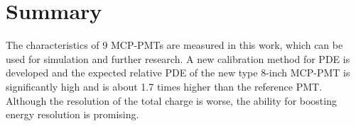 \section{Summary}
\label{Summary}
The characteristics of 9 MCP-PMTs are measured in this work, which can be used for simulation and further research. A new calibration method for PDE is developed and the expected relative PDE of the new type 8-inch MCP-PMT is significantly high and is about 1.7 times higher than the reference PMT. Although the resolution of the total charge is worse, the ability for boosting energy resolution is promising.